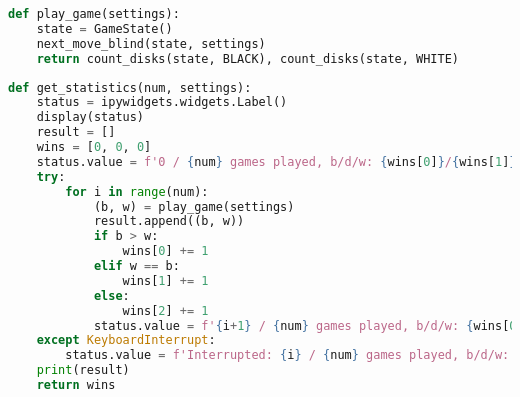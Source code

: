 \begin{lstlisting}[language=Python]
def play_game(settings):
    state = GameState()
    next_move_blind(state, settings)
    return count_disks(state, BLACK), count_disks(state, WHITE)
\end{lstlisting}

\begin{lstlisting}[language=Python]
def get_statistics(num, settings):
    status = ipywidgets.widgets.Label()
    display(status)
    result = []
    wins = [0, 0, 0]
    status.value = f'0 / {num} games played, b/d/w: {wins[0]}/{wins[1]}/{wins[2]}'
    try:
        for i in range(num):
            (b, w) = play_game(settings)
            result.append((b, w))
            if b > w:
                wins[0] += 1
            elif w == b:
                wins[1] += 1
            else:
                wins[2] += 1
            status.value = f'{i+1} / {num} games played, b/d/w: {wins[0]}/{wins[1]}/{wins[2]}'
    except KeyboardInterrupt:
        status.value = f'Interrupted: {i} / {num} games played, b/d/w: {wins[0]}/{wins[1]}/{wins[2]}'
    print(result)
    return wins
\end{lstlisting}
